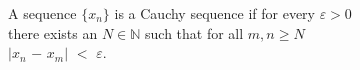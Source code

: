 \documentclass[preview]{standalone}
\begin{document}
\begin{center}
A sequence $\{x_n\}$ is a Cauchy sequence if for every $\varepsilon > 0$\\there exists an $N \in \mathbb{N}$ such that for all $m, n$$ \geq N$\\$|$$x_n$ $-$ $x_m$$|$ $<$ $\varepsilon$.
\end{center}
\end{document}
